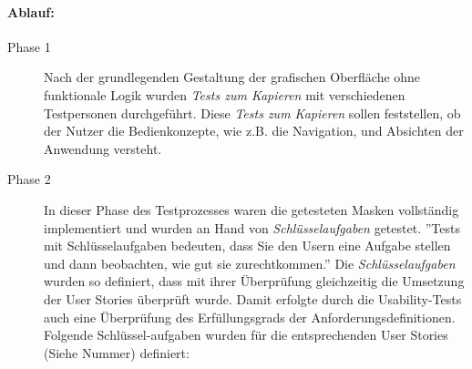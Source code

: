 \paragraph*{Ablauf:}
\begin{description}

        \item[Phase 1] Nach der grundlegenden Gestaltung der grafischen Oberfläche ohne funktionale Logik wurden \textit{Tests zum Kapieren} mit verschiedenen Testpersonen durchgeführt. Diese \textit{Tests zum Kapieren} sollen feststellen, ob der Nutzer die Bedienkonzepte, wie z.B. die Navigation, und Absichten der Anwendung versteht\cite[Vgl. S. 144]{Usability}.

        \item[Phase 2] In dieser Phase des Testprozesses waren die getesteten Masken vollständig implementiert und wurden an Hand von \textit{Schlüsselaufgaben} getestet. ''Tests mit Schlüsselaufgaben bedeuten, dass Sie den Usern eine Aufgabe stellen und dann beobachten, wie gut sie zurechtkommen\cite[Vgl. S. 144]{Usability}.'' Die \textit{Schlüsselaufgaben} wurden so definiert, dass mit ihrer Überprüfung gleichzeitig die Umsetzung der User Stories überprüft wurde. Damit erfolgte durch die Usability-Tests auch eine Überprüfung des Erfüllungsgrads der Anforderungsdefinitionen. Folgende Schlüssel-aufgaben wurden für die entsprechenden User Stories (Siehe Nummer) definiert:


\end{description}

